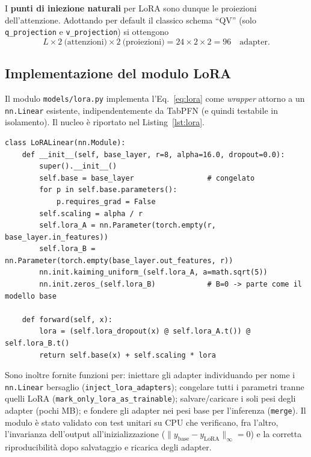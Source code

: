 \documentclass[11pt,a4paper]{article}
\begin{document}
I \textbf{punti di iniezione naturali} per LoRA sono dunque le proiezioni
dell'attenzione. Adottando per default il classico schema ``QV'' (solo
\texttt{q\_projection} e \texttt{v\_projection}) si ottengono
\[
  L \times 2~\text{(attenzioni)} \times 2~\text{(proiezioni)} = 24\times2\times2 = 96
  \quad\text{adapter}.
\]

\subsection{Implementazione del modulo LoRA}
Il modulo \texttt{models/lora.py} implementa l'Eq.~\eqref{eq:lora} come
\emph{wrapper} attorno a un \texttt{nn.Linear} esistente, indipendentemente da
TabPFN (e quindi testabile in isolamento). Il nucleo è riportato nel
Listing~\ref{lst:lora}.

\begin{lstlisting}[caption={Nucleo del wrapper \texttt{LoRALinear} (semplificato).},label=lst:lora]
class LoRALinear(nn.Module):
    def __init__(self, base_layer, r=8, alpha=16.0, dropout=0.0):
        super().__init__()
        self.base = base_layer                 # congelato
        for p in self.base.parameters():
            p.requires_grad = False
        self.scaling = alpha / r
        self.lora_A = nn.Parameter(torch.empty(r, base_layer.in_features))
        self.lora_B = nn.Parameter(torch.empty(base_layer.out_features, r))
        nn.init.kaiming_uniform_(self.lora_A, a=math.sqrt(5))
        nn.init.zeros_(self.lora_B)            # B=0 -> parte come il modello base

    def forward(self, x):
        lora = (self.lora_dropout(x) @ self.lora_A.t()) @ self.lora_B.t()
        return self.base(x) + self.scaling * lora
\end{lstlisting}

Sono inoltre fornite funzioni per: iniettare gli adapter individuando per nome i
\texttt{nn.Linear} bersaglio (\texttt{inject\_lora\_adapters}); congelare tutti i
parametri tranne quelli LoRA (\texttt{mark\_only\_lora\_as\_trainable});
salvare/caricare i soli pesi degli adapter (pochi MB); e fondere gli adapter nei
pesi base per l'inferenza (\texttt{merge}). Il modulo è stato validato con test
unitari su CPU che verificano, fra l'altro, l'invarianza dell'output
all'inizializzazione ($\lVert y_{\text{base}}-y_{\text{LoRA}}\rVert_\infty = 0$)
e la corretta riproducibilità dopo salvataggio e ricarica degli adapter.
\end{document}
